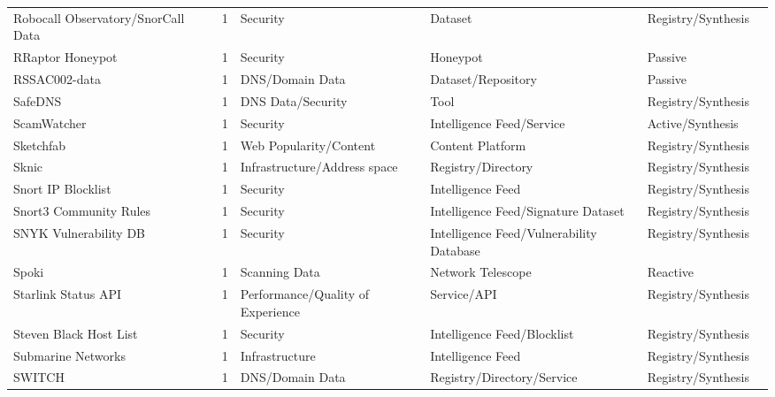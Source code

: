 \documentclass[11pt,a4paper]{article}
\begin{document}
\begin{longtable}{@{}p{}p{}p{}p{}p{}p{}p{}@{}}
Robocall Observatory/SnorCall Data & \cite{3620237.3620262} & 1 & Security & Dataset & Registry/Synthesis & \cite{10.1145/3777912.3839819} \\
RRaptor Honeypot & \cite{rraptor} & 1 & Security & Honeypot & Passive & \cite{10.1145/3777912.3839819} \\
RSSAC002-data & \cite{rssac} & 1 & DNS/Domain Data & Dataset/Repository & Passive & \cite{10.1007/978-3-030-98785-5_12} \\
SafeDNS & \cite{safedns} & 1 & DNS Data/Security & Tool & Registry/Synthesis & \cite{10.1145/3777912.3839806} \\
ScamWatcher & \cite{scamwatcher} & 1 & Security & Intelligence Feed/Service & Active/Synthesis & \cite{10.1145/3618257.3624822} \\
Sketchfab & \cite{sketchfab} & 1 & Web Popularity/Content & Content Platform & Registry/Synthesis & \cite{10.1145/3618257.3624833} \\
Sknic & \cite{sknic} & 1 & Infrastructure/Address space & Registry/Directory & Registry/Synthesis & \cite{10.1007/978-3-031-85960-1_5} \\
Snort IP Blocklist & \cite{snortip} & 1 & Security & Intelligence Feed & Registry/Synthesis & \cite{10.1007/978-3-030-72582-2_31} \\
Snort3 Community Rules & \cite{snortcomrules} & 1 & Security & Intelligence Feed/Signature Dataset & Registry/Synthesis & \cite{10.1007/978-3-031-56252-5_15} \\
SNYK Vulnerability DB & \cite{snyk} & 1 & Security & Intelligence Feed/Vulnerability Database & Registry/Synthesis & \cite{10.1145/3618257.3624804} \\
Spoki & \cite{spoki} & 1 & Scanning Data & Network Telescope & Reactive & \cite{10.1145/3777912.3839790} \\
Starlink Status API & \cite{dishy} & 1 & Performance/Quality of Experience & Service/API & Registry/Synthesis & \cite{10.1145/3517745.3561457} \\
Steven Black Host List & \cite{stevenblack} & 1 & Security & Intelligence Feed/Blocklist & Registry/Synthesis & \cite{10.1145/3618257.3624842} \\
Submarine Networks & \cite{submarinenet} & 1 & Infrastructure & Intelligence Feed & Registry/Synthesis & \cite{10.1145/3777912.3839834} \\
SWITCH & \cite{switch} & 1 & DNS/Domain Data & Registry/Directory/Service & Registry/Synthesis & \cite{10.1145/3618257.3624797} \\

\end{longtable}
\end{document}
